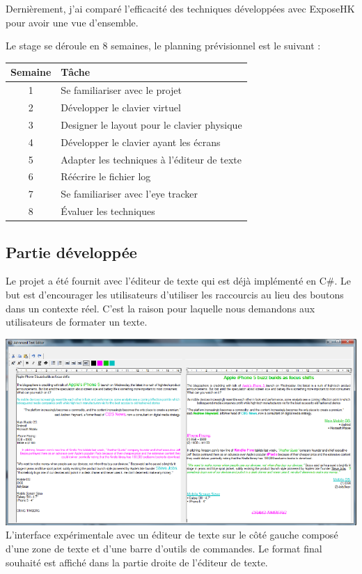 \documentclass[12pt,a4paper]{article}
\begin{document}
Dernièrement, j'ai comparé l'efficacité des techniques développées avec ExposeHK pour avoir une vue d'ensemble.

Le stage se déroule en 8 semaines, le planning prévisionnel est le suivant :
\begin{center}
	\begin{tabular}{c|l}
		Semaine & Tâche \\ \hline \hline
		1 & Se familiariser avec le projet\\
		2 & Développer le clavier virtuel\\
		3 & Designer le layout pour le clavier physique\\
		4 & Développer le clavier ayant les écrans\\
		5 & Adapter les techniques à l'éditeur de texte\\
		6 & Réécrire le fichier log\\
		7 & Se familiariser avec l'eye tracker\\
		8 & Évaluer les techniques
	\end{tabular}
\end{center}
\subsection{Partie développée}
Le projet a été fournit avec l'éditeur de texte qui est déjà implémenté en C\#. Le but est d'encourager les utilisateurs d'utiliser les raccourcis au lieu des boutons dans un contexte réel. C'est la raison pour laquelle nous demandons aux utilisateurs de formater un texte.
\begin{center}
	\includegraphics[width=1\linewidth]{Editor.png}
	L'interface expérimentale avec un éditeur de texte sur le côté gauche composé d'une zone de texte et d'une barre d'outils de commandes. Le format final souhaité est affiché dans la partie droite de l'éditeur de texte.
\end{center}
\end{document}
